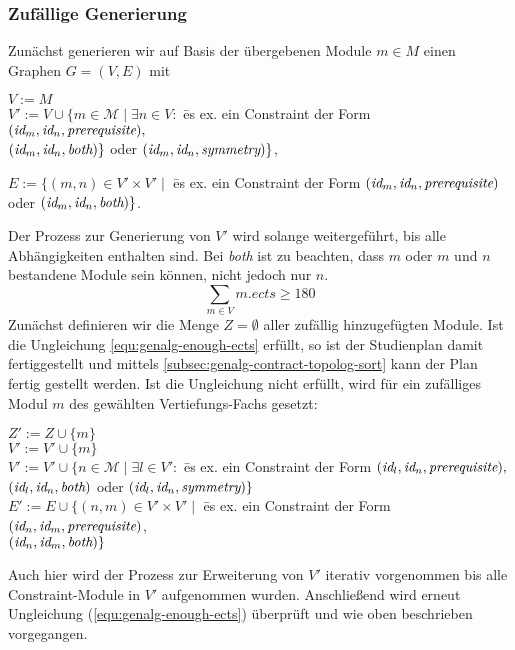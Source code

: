 \subsubsection{Zufällige Generierung}
\label{subsec:genalg-random-generation}
Zunächst generieren wir auf Basis der übergebenen Module $m \in M$ einen Graphen $G = (V, E)$ mit 
\begin{nstabbing}
	\quad $V := M$\\
	\quad $V' := V \cup \{m \in \mathcal{M} \mid \exists n \in V: $ \= es ex. ein Constraint der Form $ (\textit{id}_{m}, \textit{id}_{n}, \textit{prerequisite}), $ \\ 
	\> $ (\textit{id}_{m}, \textit{id}_{n}, \textit{both}) \} $ oder $ (\textit{id}_{m}, \textit{id}_{n}, \textit{symmetry}) \} $, 
\end{nstabbing}
\begin{nstabbing}
	\quad $E := \{ (m, n) \in V' \times V' \mid $ \= es ex. ein Constraint der Form $ (\textit{id}_{m}, \textit{id}_{n}, \textit{prerequisite}) $ \\
	\> oder $ (\textit{id}_{m}, \textit{id}_{n}, \textit{both})  \} $.
\end{nstabbing}
Der Prozess zur Generierung von $V'$ wird solange weitergeführt, bis alle Abhängigkeiten enthalten sind.
Bei \textit{both} ist zu beachten, dass $ m $ oder $ m $ und $ n $ bestandene Module sein können, nicht jedoch nur $ n $.
\begin{equation}
\sum_{m\in V}m.ects \geqslant 180
\label{equ:genalg-enough-ects}
\end{equation}
Zunächst definieren wir die Menge $Z=\emptyset$ aller zufällig hinzugefügten Module.
Ist die Ungleichung \ref{equ:genalg-enough-ects} erfüllt, so ist der Studienplan damit fertiggestellt und mittels \ref{subsec:genalg-contract-topolog-sort} kann der Plan fertig gestellt werden.
Ist die Ungleichung nicht erfüllt, wird für ein zufälliges Modul $m$ des gewählten Vertiefungs-Fachs gesetzt:
\begin{nstabbing} 
	\quad $Z' := Z \cup \{m\}$ \\
	\quad $V' := V' \cup \{m\}$ \\
	\quad $V' := V' \cup \{ n \in \mathcal{M} \mid \exists l \in V':$ \= es ex. ein Constraint der Form  $(\textit{id}_{l}, \textit{id}_{n}, \textit{prerequisite}), $ \\
	\>  $(\textit{id}_{l}, \textit{id}_{n}, \textit{both})$  oder $(\textit{id}_{l}, \textit{id}_{n}, \textit{symmetry}) \}$  \\
	\quad $E' := E \cup \{ (n, m) \in V' \times V' \mid$ \= es ex. ein Constraint der Form $(\textit{id}_{n}, \textit{id}_{m}, \textit{prerequisite})$,\\
	\> $(\textit{id}_{n}, \textit{id}_{m}, \textit{both})  \}$
\end{nstabbing}
Auch hier wird der Prozess zur Erweiterung von $V'$ iterativ vorgenommen bis alle Constraint-Module in $V'$ aufgenommen wurden.
Anschließend wird erneut Ungleichung (\ref{equ:genalg-enough-ects}) überprüft und wie oben beschrieben vorgegangen.

